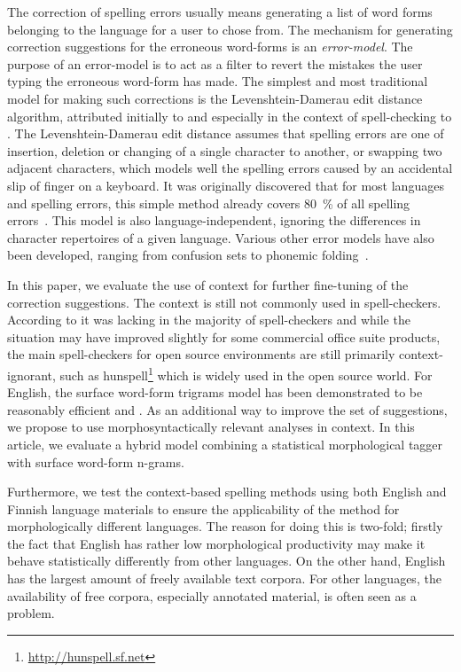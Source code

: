 \documentclass{llncs}
\begin{document}
The correction of spelling errors usually means generating a list of word forms
belonging to the language for a user to chose from. The mechanism for generating 
correction suggestions for the erroneous word-forms
is an \emph{error-model}. The purpose of an error-model is to act as a
filter to revert the mistakes the user typing the erroneous word-form has made.
The simplest and most traditional model for making such corrections is the
Levenshtein-Damerau edit distance algorithm, attributed initially to
\cite{levenshtein/1966} and especially in the context of spell-checking to
\cite{damerau/1964}. The Levenshtein-Damerau edit distance assumes that spelling
errors are one of insertion, deletion or changing of a single character to
another, or swapping two adjacent characters, which models well the spelling
errors caused by an accidental slip of finger on a keyboard. It was originally
discovered that for most languages and spelling errors, this simple method
already covers 80~\% of all spelling errors~\cite{damerau/1964}. This model is
also language-independent, ignoring the differences in character repertoires of
a given language. Various other error models have also been developed, ranging
from confusion sets to phonemic folding~\cite{kukich/1992}.

In this paper, we evaluate the use of context for further fine-tuning of the
correction suggestions. The context is still not commonly used in
spell-checkers. According to \cite{kukich/1992} it was lacking in the majority
of spell-checkers and while the situation may have improved slightly for some
commercial office suite products, the main spell-checkers for open source
environments are still primarily context-ignorant, such as
hunspell\footnote{\url{http://hunspell.sf.net}} which is widely used in the open source
world.  For English, the surface word-form trigrams model has been demonstrated
to be reasonably efficient \cite[for non-word cases]{church/1991} and
\cite[for real-word cases]{mays/1991}. As an additional way to improve the 
set of suggestions, we propose to use morphosyntactically
relevant analyses in context. In this
article, we evaluate a hybrid model combining a statistical
morphological tagger~\cite{silfverberg/2011} with surface word-form
n-grams.

Furthermore, we test the context-based spelling methods using both English and
Finnish language materials to ensure the applicability of the method for
morphologically different languages. The reason for doing this is two-fold; firstly
the fact that English has rather low morphological productivity may make
it behave statistically differently from other languages. On the other hand,
English has the largest amount of freely available text corpora. For other
languages, the availability of free corpora, especially annotated material, is
often seen as a problem.
\end{document}
